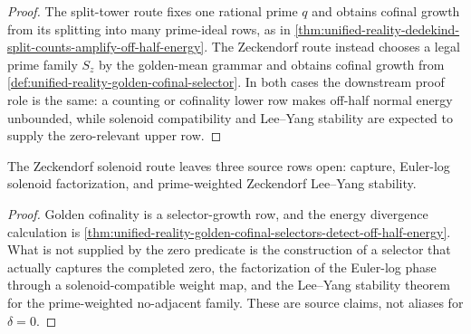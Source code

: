 \begin{proof}
The split-tower route fixes one rational prime $q$ and obtains cofinal
growth from its splitting into many prime-ideal rows, as in
\autoref{thm:unified-reality-dedekind-split-counts-amplify-off-half-energy}.
The Zeckendorf route instead chooses a legal prime family $S_z$ by the
golden-mean grammar and obtains cofinal growth from
\autoref{def:unified-reality-golden-cofinal-selector}.  In both cases
the downstream proof role is the same: a counting or cofinality lower
row makes off-half normal energy unbounded, while solenoid compatibility
and Lee--Yang stability are expected to supply the zero-relevant upper
row.
\end{proof}

\begin{corollary}
\label{cor:unified-reality-zeckendorf-solenoid-three-open-rows}
The Zeckendorf solenoid route leaves three source rows open:
capture, Euler-log solenoid factorization, and prime-weighted
Zeckendorf Lee--Yang stability.
\end{corollary}

\begin{proof}
Golden cofinality is a selector-growth row, and the energy divergence
calculation is
\autoref{thm:unified-reality-golden-cofinal-selectors-detect-off-half-energy}.
What is not supplied by the zero predicate is the construction of a
selector that actually captures the completed zero, the factorization of
the Euler-log phase through a solenoid-compatible weight map, and the
Lee--Yang stability theorem for the prime-weighted no-adjacent family.
These are source claims, not aliases for $\delta=0$.
\end{proof}

